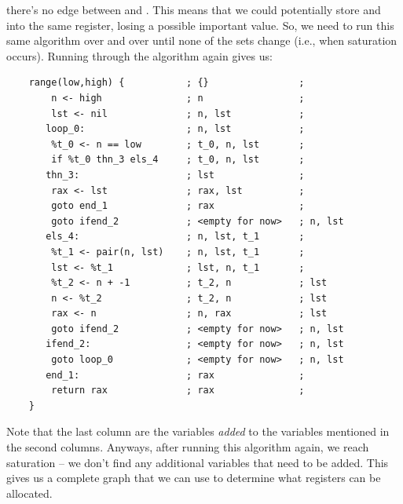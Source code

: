 \documentclass[letterpaper]{article}
\begin{document}
there's no edge between  and . This means that we could potentially store  and  into the same register, losing a possible important value. So, we need to run this same algorithm over and over until none of the sets change (i.e., when saturation occurs). Running through the algorithm again gives us: 
\begin{verbatim}
    range(low,high) {           ; {}                ; 
        n <- high               ; n                 ; 
        lst <- nil              ; n, lst            ; 
       loop_0:                  ; n, lst            ; 
        %t_0 <- n == low        ; t_0, n, lst       ; 
        if %t_0 thn_3 els_4     ; t_0, n, lst       ; 
       thn_3:                   ; lst               ; 
        rax <- lst              ; rax, lst          ;
        goto end_1              ; rax               ; 
        goto ifend_2            ; <empty for now>   ; n, lst
       els_4:                   ; n, lst, t_1       ; 
        %t_1 <- pair(n, lst)    ; n, lst, t_1       ; 
        lst <- %t_1             ; lst, n, t_1       ; 
        %t_2 <- n + -1          ; t_2, n            ; lst 
        n <- %t_2               ; t_2, n            ; lst 
        rax <- n                ; n, rax            ; lst
        goto ifend_2            ; <empty for now>   ; n, lst
       ifend_2:                 ; <empty for now>   ; n, lst
        goto loop_0             ; <empty for now>   ; n, lst
       end_1:                   ; rax               ; 
        return rax              ; rax               ; 
    }\end{verbatim}
Note that the last column are the variables \emph{added} to the variables mentioned in the second columns. Anyways, after running this algorithm again, we reach saturation -- we don't find any additional variables that need to be added. This gives us a complete graph that we can use to determine what registers can be allocated.
\end{document}
